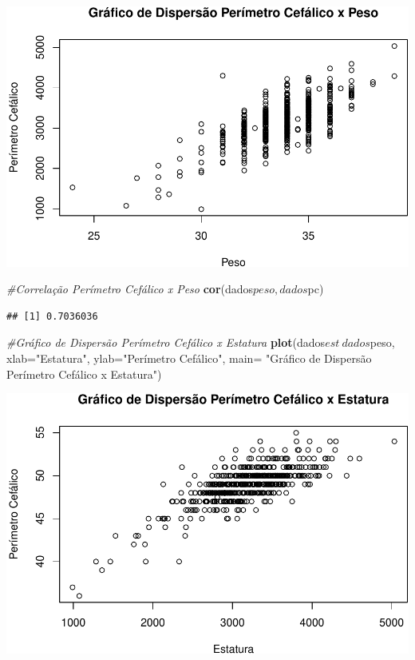 \documentclass[11pt,]{article}
\makeatletter
\newenvironment{Shaded}{\begin{snugshade}}{\end{snugshade}}
\newcommand{\KeywordTok}[1]{\textcolor[rgb]{0.13,0.29,0.53}{\textbf{{#1}}}}
\newcommand{\DataTypeTok}[1]{\textcolor[rgb]{0.13,0.29,0.53}{{#1}}}
\newcommand{\StringTok}[1]{\textcolor[rgb]{0.31,0.60,0.02}{{#1}}}
\newcommand{\CommentTok}[1]{\textcolor[rgb]{0.56,0.35,0.01}{\textit{{#1}}}}
\newcommand{\NormalTok}[1]{{#1}}
\def\maxwidth{\ifdim\Gin@nat@width>\linewidth\linewidth
\else\Gin@nat@width\fi}
\let\Oldincludegraphics\includegraphics
\renewcommand{\includegraphics}[1]{\Oldincludegraphics[width=\maxwidth]{#1}}
\makeatother
\begin{document}
\includegraphics{versaofinal_lista3_files/figure-latex/unnamed-chunk-8-1.pdf}

\begin{Shaded}
\begin{Highlighting}[]
\CommentTok{#Correlação Perímetro Cefálico x Peso}
\KeywordTok{cor}\NormalTok{(dados$peso,dados$pc)}
\end{Highlighting}
\end{Shaded}

\begin{verbatim}
## [1] 0.7036036
\end{verbatim}

\begin{Shaded}
\begin{Highlighting}[]
\CommentTok{#Gráfico de Dispersão Perímetro Cefálico x Estatura}
\KeywordTok{plot}\NormalTok{(dados$est~dados$peso, }\DataTypeTok{xlab=}\StringTok{"Estatura"}\NormalTok{, }\DataTypeTok{ylab=}\StringTok{"Perímetro Cefálico"}\NormalTok{,}
     \DataTypeTok{main=} \StringTok{"Gráfico de Dispersão Perímetro Cefálico x Estatura"}\NormalTok{)}
\end{Highlighting}
\end{Shaded}

\includegraphics{versaofinal_lista3_files/figure-latex/unnamed-chunk-10-1.pdf}
\end{document}

